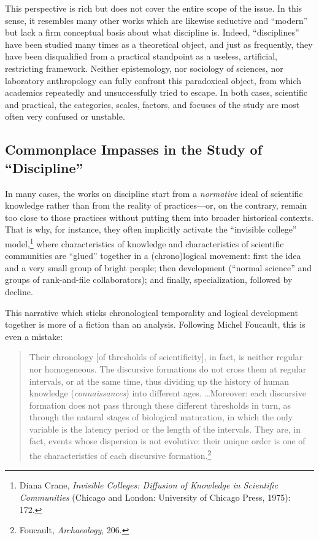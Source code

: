 \documentclass{tufte-handout}
\begin{document}
This perspective is rich but does not cover the entire scope of the
issue. In this sense, it resembles many other works which are likewise
seductive and ``modern'' but lack a firm conceptual basis about what
discipline is. Indeed, ``disciplines'' have been studied many times as a
theoretical object, and just as frequently, they have been disqualified
from a practical standpoint as a useless, artificial, restricting
framework. Neither epistemology, nor sociology of sciences, nor
laboratory anthropology can fully confront this paradoxical object, from
which academics repeatedly and unsuccessfully tried to escape. In both
cases, scientific and practical, the categories, scales, factors, and
focuses of the study are most often very confused or unstable.

\hypertarget{commonplace-impasses-in-the-study-of-discipline}{%
\subsection{Commonplace Impasses in the Study
of ``Discipline''
}\label{commonplace-impasses-in-the-study-of-discipline}}




In many cases, the works on discipline start from a \emph{normative}
ideal of scientific knowledge rather than from the reality of
practices---or, on the contrary, remain too close to those practices
without putting them into broader historical contexts. That is why, for
instance, they often implicitly activate the ``invisible college''
model,\footnote{Diana Crane, \emph{Invisible Colleges: Diffusion of
  Knowledge in Scientific Communities} (Chicago and London: University
  of Chicago Press, 1975): 172.} where characteristics of knowledge and
characteristics of scientific communities are ``glued'' together in a
(chrono)logical movement: first the idea and a very small group of
bright people; then development (``normal science'' and groups of
rank-and-file collaborators); and finally, specialization, followed by
decline.

This narrative which sticks chronological temporality and logical
development together is more of a fiction than an analysis. Following
Michel Foucault, this is even a mistake:

\begin{quote}
Their chronology {[}of thresholds of scientificity{]}, in fact, is
neither regular nor homogeneous. The discursive formations do not cross
them at regular intervals, or at the same time, thus dividing up the
history of human knowledge (\emph{connaissances}) into different ages. \ldots Moreover: each discursive formation does not pass through these
different thresholds in turn, as through the natural stages of
biological maturation, in which the only variable is the latency period
or the length of the intervals. They are, in fact, events whose
dispersion is not evolutive: their unique order is one of the
characteristics of each discursive formation.\footnote{Foucault,
  \emph{Archaeology}, 206.}
\end{quote}
\end{document}
